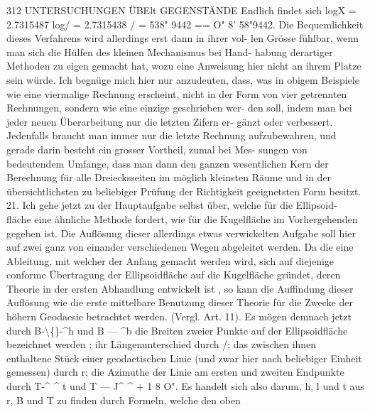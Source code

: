 \documentclass[12pt,a4paper]{article}
\begin{document}
312  UNTERSUCHUNGEN  ÜBElt  GEGENSTÄNDE Endlich  findet  sich logX  =  2.7315487 log/  =  2.7315438 /  =  538"  9442  ==  O"  8'  58"9442. Die  Bequemlichkeit  dieses  Verfahrens  wird  allerdings  erst  dann  in  ihrer  vol- len Grösse  fühlbar,  wenn  man  sich  die  Hülfen  des  kleinen  Mechanismus  bei  Hand- habung derartiger  Methoden  zu  eigen  gemacht  hat,  wozu  eine  Anweisung  hier nicht  an  ihrem  Platze  sein  würde.  Ich  begnüge  mich  hier  nur  anzudeuten,  dass, was  in  obigem  Beispiele  wie  eine  viermalige  Rechnung  erscheint,  nicht  in  der Form  von  vier  getrennten  Rechnungen,  sondern  wie  eine  einzige  geschrieben  wer- den soll,  indem  man  bei  jeder  neuen  Überarbeitung  nur  die  letzten  Zifern  er- gänzt oder  verbessert.  Jedenfalls  braucht  man  immer  nur  die  letzte  Rechnung aufzubewahren,  und  gerade  darin  besteht  ein  grosser  Vortheil,  zumal  bei  Mes- sungen von  bedeutendem  Umfange,  dass  man  dann  den  ganzen  wesentlichen  Kern der  Berechnung  für  alle  Dreiecksseiten  im  möglich  kleinsten  Räume  und  in  der übersichtlichsten  zu  beliebiger  Prüfung  der  Richtigkeit  geeignetsten  Form  besitzt. 21. Ich  gehe  jetzt  zu  der  Hauptaufgabe  selbst  über,  welche  für  die  Ellipsoid- fläche  eine  ähnliche  Methode  fordert,  wie  für  die  Kugelfläche  im  Vorhergehenden gegeben  ist.  Die  Auflösung  dieser  allerdings  etwas  verwickelten  Aufgabe  soll hier  auf  zwei  ganz  von  einander  verschiedenen  Wegen  abgeleitet  werden.  Da  die eine  Ableitung,  mit  welcher  der  Anfang  gemacht  werden  wird,  sich  auf  diejenige conforme  Übertragung  der  Ellipsoidfläche  auf  die  Kugelfläche  gründet,  deren Theorie  in  der  ersten  Abhandlung  entwickelt  ist ,  so  kann  die  Auffindung  dieser Auflösung  wie  die  erste  mittelbare  Benutzung  dieser  Theorie  für  die  Zwecke  der höhern  Geodaesie  betrachtet  werden.     (Vergl.  Art.  11). Es  mögen  demnach  jetzt  durch  B-\textbackslash\{\}-\^{}h  und  B  ---  \^{}b  die  Breiten  zweier Punkte  auf  der  Ellipsoidfläche  bezeichnet  werden ;  ihr  Längenunterschied  durch  /; das  zwischen  ihnen  enthaltene  Stück  einer  geodaetischen  Linie  (und  zwar  hier nach  beliebiger  Einheit  gemessen)  durch  r;  die  Azimuthe  der  Linie  am  ersten und  zweiten  Endpunkte  durch  T-\^{}  \^{}  t  und  T  ---  J\^{}  \^{}  +  1 8  O".  Es  handelt  sich  also darum,    h,  l  und  t  aus  r,  B  und  T  zu  finden  durch  Formeln,  welche  den  oben
\end{document}
